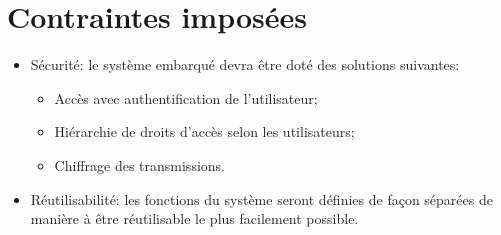 
\section{Contraintes imposées}

    \begin{itemize}
        \item Sécurité: le système embarqué devra être doté des
            solutions suivantes:
            \begin{itemize}
                \item Accès avec authentification de l'utilisateur;
                \item Hiérarchie de droits d'accès selon les
                    utilisateurs;
                \item Chiffrage des transmissions.
            \end{itemize}
        \item Réutilisabilité: les fonctions du système seront définies
            de façon séparées de manière à être réutilisable le plus
            facilement possible.
    \end{itemize}
